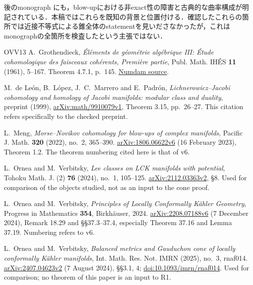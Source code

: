 \documentclass[12pt]{amsart}
\theoremstyle{definition}
\theoremstyle{remark}
\numberwithin{equation}{section}
\begin{document}
後のmonograph \cite[Remark 18.29, \S\S37.3--37.4]{OVBook}にも，blow-upにおける非exact性の障害と古典的な曲率構成が明記されている．本稿ではこれらを既知の背景と位置付ける．確認したこれらの箇所では近接不等式による錐全体のstatementを見いださなかったが，これはmonographの全箇所を検査したという主張ではない．

\clearpage

\begin{thebibliography}{OVV13}
A.~Grothendieck, \emph{\'El\'ements de g\'eom\'etrie alg\'ebrique III: \'Etude cohomologique des faisceaux coh\'erents, Premi\`ere partie}, Publ. Math. IH\'ES \textbf{11} (1961), 5--167. Theorem 4.7.1, p.~145.
\href{https://www.numdam.org/item/PMIHES_1961__11__5_0/}{Numdam source}.

M.~de Le\'on, B.~L\'opez, J.~C.~Marrero and E.~Padr\'on,
\emph{Lichnerowicz--Jacobi cohomology and homology of Jacobi manifolds: modular class and duality}, preprint (1999),
\href{https://arxiv.org/abs/math/9910079}{arXiv:math/9910079v1}, Theorem 3.15, pp.~26--27. This citation refers specifically to the checked preprint.

L.~Meng, \emph{Morse--Novikov cohomology for blow-ups of complex manifolds}, Pacific J. Math. \textbf{320} (2022), no.~2, 365--390.
\href{https://arxiv.org/abs/1806.06622}{arXiv:1806.06622v6} (16 February 2023), Theorem 1.2. The theorem numbering cited here is that of v6.

L.~Ornea and M.~Verbitsky, \emph{Lee classes on LCK manifolds with potential}, Tohoku Math. J. (2) \textbf{76} (2024), no.~1, 105--125.
\href{https://arxiv.org/abs/2112.03363}{arXiv:2112.03363v2}, \S8. Used for comparison of the objects studied, not as an input to the cone proof.

L.~Ornea and M.~Verbitsky, \emph{Principles of Locally Conformally K\"ahler Geometry}, Progress in Mathematics \textbf{354}, Birkh\"auser, 2024.
\href{https://arxiv.org/abs/2208.07188}{arXiv:2208.07188v6} (7 December 2024), Remark 18.29 and \S\S37.3--37.4, especially Theorem 37.16 and Lemma 37.19. Numbering refers to v6.

L.~Ornea and M.~Verbitsky, \emph{Balanced metrics and Gauduchon cone of locally conformally K\"ahler manifolds},
Int. Math. Res. Not. IMRN (2025), no.~3, rnaf014.
\href{https://arxiv.org/abs/2407.04623}{arXiv:2407.04623v2} (7 August 2024), \S\S3.1, 4;
\href{https://doi.org/10.1093/imrn/rnaf014}{doi:10.1093/imrn/rnaf014}. Used for comparison; no theorem of this paper is an input to R1.


\end{thebibliography}
\end{document}
